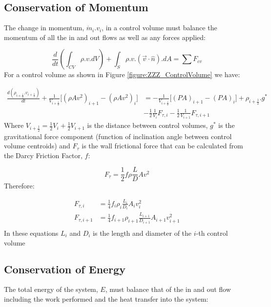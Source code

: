\documentclass[11pt,letterpaper,titlepage]{article}
\newcommand{\half}{\frac{1}{2}}
\begin{document}
\subsection{Conservation of Momentum}
The change in momentum, $\dot{m}_i.v_{i}$, in a control volume must balance the momentum of all the in and out flows as well as any forces applied:

\begin{equation*}
\frac{d}{dt}(\int_{CV}\rho.v.dV)+\int_S \rho.v.(\vec{v}\cdot \hat{n}).dA = \sum F_{cv}
\end{equation*}
\newline
\noindent For a control volume as shown in Figure \ref{figure:ZZZ_ControlVolume} we have:

\begin{equation}
\begin{aligned}
\frac{d(\rho_{i+\half}.v_{i+\half})}{dt}+ \frac{1}{V_{i+\half}} \biggr[   (\rho Av^2)_{i+1} - (\rho Av^2)_{i} \biggr]      &=-\frac{1}{V_{i+\half}} \biggr[   (PA)_{i+1}-(PA)_{i}  \biggr] +\rho_{i+\half}.g^* \\
&-\half \frac{1}{V_i}F_{\tau,i}-\half \frac{1}{V_{i+1}}F_{\tau,i+1}
\end{aligned}
\end{equation}
\newline
\noindent 
Where $V_{i+\half}=\half V_i+\half V_{i+1}$ is the distance between control volumes, $g^*$ is the gravitational force component (function of inclination angle between control volume centroids) and $F_{\tau}$ is the wall frictional force that can be calculated from the Darcy Friction Factor, $f$:

\begin{equation*}
F_{\tau}=\half f \rho \frac{L}{D} A v^2
\end{equation*} 
\noindent Therefore:

\begin{equation*}
\begin{aligned}
F_{\tau,i}&=\frac{1}{4} f_i \rho_i \frac{L_i}{D_i}A_i v_i^2 \\
F_{\tau,i+1}&=\frac{1}{4} f_{i+1} \rho_{i+1} \frac{L_{i+1}}{D_{i+1}}A_{i+1} v_{i+1}^2 \\
\end{aligned}
\end{equation*}
\newline
\noindent
In these equations $L_i$ and $D_i$ is the length and diameter of the $i$-th control volume


\subsection{Conservation of Energy}
The total energy of the system, $E$, must balance that of the in and out flow including the work performed and the heat transfer into the system:
\end{document}
